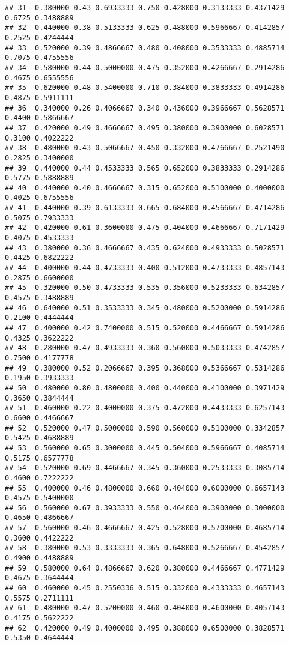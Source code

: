 \documentclass[
]{article}
\begin{document}
\begin{verbatim}
## 31  0.380000 0.43 0.6933333 0.750 0.428000 0.3133333 0.4371429 0.6725 0.3488889
## 32  0.440000 0.38 0.5133333 0.625 0.488000 0.5966667 0.4142857 0.2525 0.4244444
## 33  0.520000 0.39 0.4866667 0.480 0.408000 0.3533333 0.4885714 0.7075 0.4755556
## 34  0.580000 0.44 0.5000000 0.475 0.352000 0.4266667 0.2914286 0.4675 0.6555556
## 35  0.620000 0.48 0.5400000 0.710 0.384000 0.3833333 0.4914286 0.4875 0.5911111
## 36  0.340000 0.26 0.4066667 0.340 0.436000 0.3966667 0.5628571 0.4400 0.5866667
## 37  0.420000 0.49 0.4666667 0.495 0.380000 0.3900000 0.6028571 0.3100 0.4022222
## 38  0.480000 0.43 0.5066667 0.450 0.332000 0.4766667 0.2521490 0.2825 0.3400000
## 39  0.440000 0.44 0.4533333 0.565 0.652000 0.3833333 0.2914286 0.5775 0.5888889
## 40  0.440000 0.40 0.4666667 0.315 0.652000 0.5100000 0.4000000 0.4025 0.6755556
## 41  0.440000 0.39 0.6133333 0.665 0.684000 0.4566667 0.4714286 0.5075 0.7933333
## 42  0.420000 0.61 0.3600000 0.475 0.404000 0.4666667 0.7171429 0.4075 0.4533333
## 43  0.380000 0.36 0.4666667 0.435 0.624000 0.4933333 0.5028571 0.4425 0.6822222
## 44  0.400000 0.44 0.4733333 0.400 0.512000 0.4733333 0.4857143 0.2875 0.6600000
## 45  0.320000 0.50 0.4733333 0.535 0.356000 0.5233333 0.6342857 0.4575 0.3488889
## 46  0.640000 0.51 0.3533333 0.345 0.480000 0.5200000 0.5914286 0.2100 0.4444444
## 47  0.400000 0.42 0.7400000 0.515 0.520000 0.4466667 0.5914286 0.4325 0.3622222
## 48  0.280000 0.47 0.4933333 0.360 0.560000 0.5033333 0.4742857 0.7500 0.4177778
## 49  0.380000 0.52 0.2066667 0.395 0.368000 0.5366667 0.5314286 0.1950 0.3933333
## 50  0.480000 0.80 0.4800000 0.400 0.440000 0.4100000 0.3971429 0.3650 0.3844444
## 51  0.460000 0.22 0.4000000 0.375 0.472000 0.4433333 0.6257143 0.6600 0.4466667
## 52  0.520000 0.47 0.5000000 0.590 0.560000 0.5100000 0.3342857 0.5425 0.4688889
## 53  0.560000 0.65 0.3000000 0.445 0.504000 0.5966667 0.4085714 0.5175 0.6577778
## 54  0.520000 0.69 0.4466667 0.345 0.360000 0.2533333 0.3085714 0.4600 0.7222222
## 55  0.400000 0.46 0.4800000 0.660 0.404000 0.6000000 0.6657143 0.4575 0.5400000
## 56  0.560000 0.67 0.3933333 0.550 0.464000 0.3900000 0.3000000 0.4650 0.4866667
## 57  0.560000 0.46 0.4666667 0.425 0.528000 0.5700000 0.4685714 0.3600 0.4422222
## 58  0.380000 0.53 0.3333333 0.365 0.648000 0.5266667 0.4542857 0.4900 0.4488889
## 59  0.580000 0.64 0.4866667 0.620 0.380000 0.4466667 0.4771429 0.4675 0.3644444
## 60  0.460000 0.45 0.2550336 0.515 0.332000 0.4333333 0.4657143 0.5575 0.2711111
## 61  0.480000 0.47 0.5200000 0.460 0.404000 0.4600000 0.4057143 0.4175 0.5622222
## 62  0.420000 0.49 0.4000000 0.495 0.388000 0.6500000 0.3828571 0.5350 0.4644444

\end{verbatim}
\end{document}
